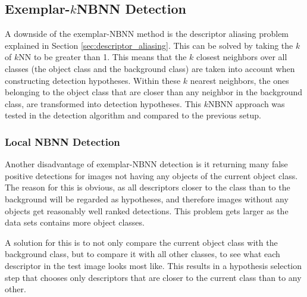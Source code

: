 
\begin{figure}[hbt]
    \centering
\end{figure}


\begin{table}[hbt]
    \centering
\end{table}


\subsection{Exemplar-$k$NBNN Detection} %
\label{sec:local_nbnn_detection}
A downside of the exemplar-NBNN method is the descriptor aliasing problem explained in Section \ref{sec:descriptor_aliasing}. This can be solved by taking the $k$ of $k$NN to be greater than 1. This means that the $k$ closest neighbors over all classes (the object class and the background class) are taken into account when constructing detection hypotheses. Within these $k$ nearest neighbors, the ones belonging to the object class that are closer than any neighbor in the background class, are transformed into detection hypotheses. This $k$NBNN approach was tested in the detection algorithm and compared to the previous setup.

\subsubsection{Local NBNN Detection} %
\label{ssub:local_nbnn_detection}

Another disadvantage of exemplar-NBNN detection is it returning many false positive detections for images not having any objects of the current object class. The reason for this is obvious, as all descriptors closer to the class than to the background will be regarded as hypotheses, and therefore images without any objects get reasonably well ranked detections. This problem gets larger as the data sets contains more object classes.

A solution for this is to not only compare the current object class with the background class, but to compare it with all other classes, to see what each descriptor in the test image looks most like. This results in a hypothesis selection step that chooses only descriptors that are closer to the current class than to any other.

